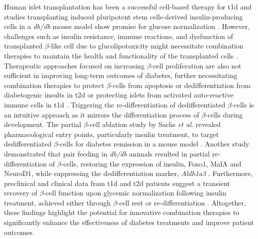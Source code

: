 \par Human islet transplantation has been a successful cell-based therapy for \gls{t1d} \textbf{\cite{cefalu_heterogeneity_2021}} and studies transplanting induced pluripotent stem cells-derived insulin-producing cells in a \textit{db/db} mouse model show promise for glucose normalization \textbf{\cite{alipio_reversal_2010}}. However, challenges such as insulin resistance, immune reactions, and  dysfunction of transplanted $\beta$-like cell due to glucolipotoxicity might necessitate combination therapies to maintain the health and functionality of the transplanted cells \textbf{\cite{salib_stem_2022}}. Therapeutic approaches focused on increasing $\beta$-cell proliferation are also not sufficient in improving long-term outcomes of diabetes, further necessitating combination therapies to protect $\beta$-cells from apoptosis or dedifferentiation from diabetogenic insults in \gls{t2d} or protecting islets from activated auto-reactive immune cells in \gls{t1d} \textbf{\cite{eguchi_dysregulation_2022}}. Triggering the re-differentiation of dedifferentiated $\beta$-cells is an intuitive approach as it mirrors the differentiation process of $\beta$-cells during development. The partial $\beta$-cell ablation study by Sachs \textit{et al.} revealed pharmacological entry points, particularly insulin treatment, to target dedifferentiated $\beta$-cells for diabetes remission in a mouse model \textbf{\cite{sachs_targeted_2020}}. Another study demonstrated that pair feeding in \textit{db/db} animals resulted in partial re-differentiation of $\beta$-cells, restoring the expression of insulin, Foxo1, MafA and NeuroD1, while suppressing the dedifferentiation marker, \textit{Aldh1a3} \textbf{\cite{ishida_pair_2017}}. Furthermore, preclinical and clinical data from \gls{t1d} and \gls{t2d} patients suggest a transient recovery of $\beta$-cell function upon glycemic normalization following insulin treatment, achieved either through $\beta$-cell rest or re-differentiation \textbf{\cite{harrison_-cell_2012,wang_pancreatic_2014}}. Altogether, these findings highlight the potential for innovative combination therapies to significantly enhance the effectiveness of diabetes treatments and improve patient outcomes.\\

